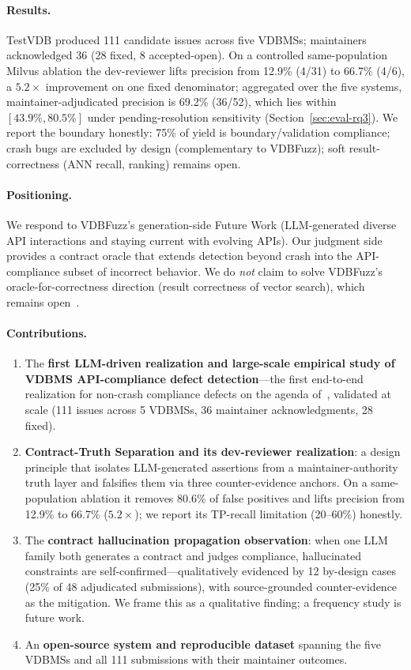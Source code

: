 \documentclass[sigconf]{acmart}
\begin{document}
\paragraph{Results.}
TestVDB produced 111 candidate issues across five VDBMSs; maintainers acknowledged 36 (28 fixed, 8 accepted-open). On a controlled same-population Milvus ablation the dev-reviewer lifts precision from 12.9\% (4/31) to 66.7\% (4/6), a $5.2\times$ improvement on one fixed denominator; aggregated over the five systems, maintainer-adjudicated precision is 69.2\% (36/52), which lies within $[43.9\%, 80.5\%]$ under pending-resolution sensitivity (Section~\ref{sec:eval-rq3}). We report the boundary honestly: 75\% of yield is boundary/validation compliance; crash bugs are excluded by design (complementary to VDBFuzz); soft result-correctness (ANN recall, ranking) remains open.

\paragraph{Positioning.}
We respond to VDBFuzz's generation-side Future Work (LLM-generated diverse API interactions and staying current with evolving APIs). Our judgment side provides a contract oracle that extends detection beyond crash into the API-compliance subset of incorrect behavior. We do \emph{not} claim to solve VDBFuzz's oracle-for-correctness direction (result correctness of vector search), which remains open~\cite{roadmap25}.

\paragraph{Contributions.}
\begin{enumerate}[leftmargin=*,itemsep=2pt]
\item The \textbf{first LLM-driven realization and large-scale empirical study of VDBMS API-compliance defect detection}---the first end-to-end realization for non-crash compliance defects on the agenda of~\cite{roadmap25}, validated at scale (111 issues across 5 VDBMSs, 36 maintainer acknowledgments, 28 fixed).
\item \textbf{Contract-Truth Separation and its dev-reviewer realization}: a design principle that isolates LLM-generated assertions from a maintainer-authority truth layer and falsifies them via three counter-evidence anchors. On a same-population ablation it removes 80.6\% of false positives and lifts precision from 12.9\% to 66.7\% ($5.2\times$); we report its TP-recall limitation (20--60\%) honestly.
\item The \textbf{contract hallucination propagation observation}: when one LLM family both generates a contract and judges compliance, hallucinated constraints are self-confirmed---qualitatively evidenced by 12 by-design cases (25\% of 48 adjudicated submissions), with source-grounded counter-evidence as the mitigation. We frame this as a qualitative finding; a frequency study is future work.
\item An \textbf{open-source system and reproducible dataset} spanning the five VDBMSs and all 111 submissions with their maintainer outcomes.
\end{enumerate}
\end{document}

